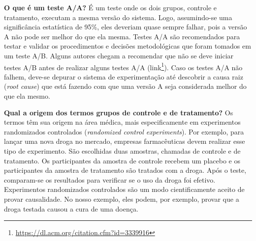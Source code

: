\documentclass[
  11pt,
  twoside]{book}
\DeclareRobustCommand{\href}[2]{#2\footnote{\url{#1}}}
\begin{document}
\textbf{O que é um teste A/A?} É um teste onde os dois grupos, controle
e tratamento, executam a mesma versão do sistema. Logo, assumindo-se uma
significância estatística de 95\%, eles deveriam quase sempre falhar,
pois a versão A não pode ser melhor do que ela mesma. Testes A/A são
recomendados para testar e validar os procedimentos e decisões
metodológicas que foram tomados em um teste A/B. Alguns autores chegam a
recomendar que não se deve iniciar testes A/B antes de realizar alguns
testes A/A (\href{https://dl.acm.org/citation.cfm?id=3339916}{link}).
Caso os testes A/A não falhem, deve-se depurar o sistema de
experimentação até descobrir a causa raiz (\emph{root cause}) que está
fazendo com que uma versão A seja considerada melhor do que ela mesmo.

\textbf{Qual a origem dos termos grupos de controle e de tratamento?} Os
termos têm sua origem na área médica, mais especificamente em
experimentos randomizados controlados (\emph{randomized control
experiments}). Por exemplo, para lançar uma nova droga no mercado,
empresas farmacêuticas devem realizar esse tipo de experimento. São
escolhidas duas amostras, chamadas de controle e de tratamento. Os
participantes da amostra de controle recebem um placebo e os
participantes da amostra de tratamento são tratados com a droga. Após o
teste, comparam-se os resultados para verificar se o uso da droga foi
efetivo. Experimentos randomizados controlados são um modo
cientificamente aceito de provar causalidade. No nosso exemplo, eles
podem, por exemplo, provar que a droga testada causou a cura de uma
doença.
\end{document}
